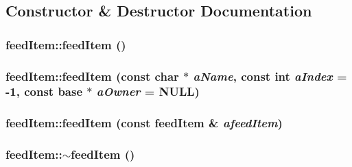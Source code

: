 \subsection{Constructor \& Destructor Documentation}
\hypertarget{classfeed_item_a73af127307e66daf2f3e33917b1280fb}{
\subsubsection[{feedItem}]{\setlength{\rightskip}{0pt plus 5cm}feedItem::feedItem ()}}
\label{classfeed_item_a73af127307e66daf2f3e33917b1280fb}
\hypertarget{classfeed_item_a197dc4177d7370a268a3415c6513f8c9}{
\subsubsection[{feedItem}]{\setlength{\rightskip}{0pt plus 5cm}feedItem::feedItem (const char $\ast$ {\em aName}, \/  const int {\em aIndex} = {\ttfamily -\/1}, \/  const {\bf base} $\ast$ {\em aOwner} = {\ttfamily NULL})}}
\label{classfeed_item_a197dc4177d7370a268a3415c6513f8c9}
\hypertarget{classfeed_item_a0580da5b8464e7ff2e0c5f3dfb7d283f}{
\subsubsection[{feedItem}]{\setlength{\rightskip}{0pt plus 5cm}feedItem::feedItem (const {\bf feedItem} \& {\em afeedItem})}}
\label{classfeed_item_a0580da5b8464e7ff2e0c5f3dfb7d283f}
\hypertarget{classfeed_item_af5ca79138cd28d4b7680dbb5a7364485}{
\subsubsection[{$\sim$feedItem}]{\setlength{\rightskip}{0pt plus 5cm}feedItem::$\sim$feedItem ()}}
\label{classfeed_item_af5ca79138cd28d4b7680dbb5a7364485}


